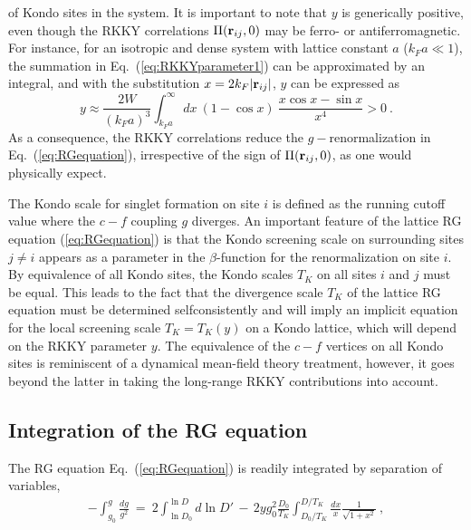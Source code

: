 \documentclass[12pt,twoside]{article}
\newcommand{\Eq}[1]{Eq.~(\ref{#1})}
\begin{document}
of Kondo sites in the system. It is important to note that  
$y$ is generically positive, even though the RKKY correlations 
$\Pi({\bf r}_{ij},0)$ may be ferro- or antiferromagnetic. 
For instance, for an isotropic and dense system with lattice constant 
$a$ ($k_Fa \ll 1$), 
the summation in Eq.~(\ref{eq:RKKYparameter1}) can be approximated 
by an integral, and with the substitution $x=2k_F|{\bf r}_{ij}|$, $y$ 
can be expressed as 
\begin{equation}
y \approx  \frac{2W}{(k_Fa)^3}
\int_{k_Fa}^{\infty} dx\ (1-\cos x)\ \frac{x \cos x - \sin x}{x^4} > 0 \ .
\label{eq:RKKYparameter2}
\end{equation} 
As a consequence, the RKKY correlations reduce the $g-$renormalization 
in \Eq{eq:RGequation}, irrespective of the sign of $\Pi({\bf r}_{ij},0)$,
as one would physically expect. 

The Kondo scale for singlet formation on site $i$ 
is defined as the running cutoff value where the $c-f$ coupling $g$ diverges.
An important feature of the lattice RG equation (\ref{eq:RGequation}) 
is that the Kondo screening scale on surrounding sites $j\neq i$ appears as a 
parameter in the $\beta$-function for the renormalization on site $i$.   
By equivalence of all Kondo sites, the Kondo scales $T_K$ on all sites 
$i$ and $j$ must be equal. This leads to the fact that the divergence 
scale $T_K$ of the lattice RG equation must be determined 
selfconsistently  and will imply  
an implicit equation for the local screening scale $T_K=T_K(y)$ 
on a Kondo lattice, which will depend  
on the RKKY parameter $y$.
The equivalence of the $c-f$ vertices on all Kondo sites is reminiscent 
of a dynamical mean-field theory treatment, 
however, it goes beyond the latter in taking the long-range RKKY contributions 
into account.   




\subsection{Integration of the RG equation}
\label{subsec:RGintegration}

The RG equation \Eq{eq:RGequation} is readily integrated by separation 
of variables,
\begin{eqnarray}
-\int_{g_0}^{g}\frac{dg}{g^2} \ = \
2 \int_{\ln D_0}^{\ln D} d\ln D' 
\label{eq:RGint1} 
\,-\,2yg_0^2\frac{D_0}{T_K}\int_{D_0/T_K}^{D/T_K}\frac{dx}{x}
\frac{1}{\sqrt{1+x^2}} \ ,
\end{eqnarray}
 
\end{document}
